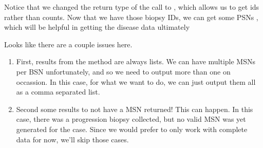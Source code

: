 \documentclass[letterpaper,10pt,english]{sphinxmanual}
\begin{document}
Notice that we changed the return type of the  call to
, which allows us to get ids rather than counts.  Now that we have those
biopsy IDs, we can get some PSNs , which will be helpful in getting the disease
data ultimately

%
\begin{sphinxVerbatim}[commandchars=\\\{\}]
   \PYG{p}{[}\PYG{p}{]}
      
      
       
\end{sphinxVerbatim}

Looks like there are a couple issues here.
\begin{enumerate}
\item {} 
First, results from the  method are always lists.  We can have
multiple MSNs per BSN unfortunately, and so we need to output more than one
on occassion.  In this case, for what we want to do, we can just output them
all as a comma separated list.

\item {} 
Second some results to not have a MSN returned!  This can happen.  In this
case, there was a progression biopsy collected, but no valid MSN was yet
generated for the case.  Since we would prefer to only work with complete
data for now, we’ll skip those cases.

\end{enumerate}
\end{document}
